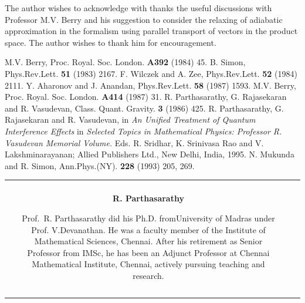 The author wishes to acknowledge with thanks the useful discussions with Professor M.V. Berry and his suggestion 
to consider the relaxing of adiabatic approximation in the formalism using parallel transport of vectors in the 
product space. The author wishes to thank him for encouragement.  

\begin{thebibliography}{99}
 M.V. Berry, Proc. Royal. Soc. London. {\bf{A392}} (1984) 45.
 B. Simon, Phys.Rev.Lett. {\bf{51}} (1983) 2167.
 F. Wilczek and A. Zee, Phys.Rev.Lett. {\bf{52}} (1984) 2111.
 Y. Aharonov and J. Anandan, Phys.Rev.Lett. {\bf{58}} (1987) 1593.
 M.V. Berry, Proc. Royal. Soc. London. {\bf{A414}} (1987) 31.  
 R. Parthasarathy, G. Rajasekaran and R. Vasudevan, Class. Quant. Gravity. {\bf{3}} (1986) 425.
 R. Parthasarathy, G. Rajasekaran and R. Vasudevan, in {\textit{An Unified Treatment of Quantum Interference Effects}} in \textit{Selected Topics in Mathematical Physics: Professor R. Vasudevan Memorial Volume.} Eds. R. Sridhar, K. Srinivasa Rao and V. Lakshminarayanan; Allied Publishers Ltd., New Delhi, India, 1995.
 N. Mukunda and R. Simon, Ann.Phys.(NY). {\bf{228}} (1993) 205, 269.
\end{thebibliography}


\begin{tabular}{V{2.5}cp{6.2cm}V{2.5}}
 &\\
 & 

\centerline{\large\bf R. Parthasarathy}

\bigskip
Prof.~R. Parthasarathy did his Ph.D. from\break University of Madras under Prof. V.Devanathan. He was a faculty member of the Institute of Mathematical Sciences, Chennai. After his retirement as Senior Professor from IMSc, he has been an Adjunct Professor at Chennai Mathematical Institute, Chennai, actively pursuing teaching and research.\\
&\\ 
\end{tabular}



